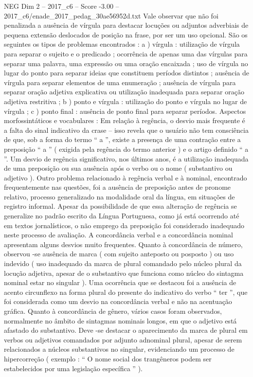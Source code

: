 \begin{textsample}{NEG Dim 2 – 2017\_c6 – Score -3.00 – 2017\_c6/enade\_2017\_pedag\_30ae56952d.txt}
Vale observar que não foi penalizada a ausência de vírgula para destacar locuções ou adjuntos adverbiais de pequena extensão deslocados de posição na frase, por ser um uso opcional.
São os seguintes os tipos de problemas encontrados : a ) vírgula : utilização de vírgula para separar o sujeito e o predicado ; ocorrência de apenas uma das vírgulas para separar uma palavra, uma expressão ou uma oração encaixada ; uso de vírgula no lugar do ponto para separar ideias que constituem períodos distintos ; ausência de vírgula para separar elementos de uma enumeração ; ausência de vírgula para separar oração adjetiva explicativa ou utilização inadequada para separar oração adjetiva restritiva ; b ) ponto e vírgula : utilização do ponto e vírgula no lugar de vírgula ; c ) ponto final : ausência de ponto final para separar períodos.
Aspectos morfossintáticos e vocabulares : Em relação à regência, o desvio mais frequente é a falta do sinal indicativo da crase – isso revela que o usuário não tem consciência de que, sob a forma do termo “ a ”, existe a presença de uma contração entre a preposição “ a ” ( exigida pela regência do termo anterior ) e o artigo definido “ a ”.
Um desvio de regência significativo, nos últimos anos, é a utilização inadequada de uma preposição ou sua ausência após o verbo ou o nome ( substantivo ou adjetivo ).
Outro problema relacionado à regência verbal e à nominal, encontrado frequentemente nas questões, foi a ausência de preposição antes de pronome relativo, processo generalizado na modalidade oral da língua, em situações de registro informal.
Apesar da possibilidade de que essa alteração de regência se generalize no padrão escrito da Língua Portuguesa, como já está ocorrendo até em textos jornalísticos, o não emprego da preposição foi considerado inadequado neste processo de avaliação.
A concordância verbal e a concordância nominal apresentam alguns desvios muito frequentes.
Quanto à concordância de número, observou -se ausência de marca ( com sujeito anteposto ou posposto ) ou uso indevido ( uso inadequado da marca de plural comandado pelo núcleo plural da locução adjetiva, apesar de o substantivo que funciona como núcleo do sintagma nominal estar no singular ).
Uma ocorrência que se destacou foi a ausência de acento circunflexo na forma plural do presente do indicativo do verbo “ ter ”, que foi considerada como um desvio na concordância verbal e não na acentuação gráfica.
Quanto à concordância de gênero, vários casos foram observados, normalmente no âmbito de sintagmas nominais longos, em que o adjetivo está afastado do substantivo.
Deve -se destacar o aparecimento da marca de plural em verbos ou adjetivos comandados por adjunto adnominal plural, apesar de serem relacionados a núcleos substantivos no singular, evidenciando um processo de hipercorreção ( exemplo : “ O nome social dos trangêneros podem ser estabelecidos por uma legislação específica ” ).

\end{textsample}

